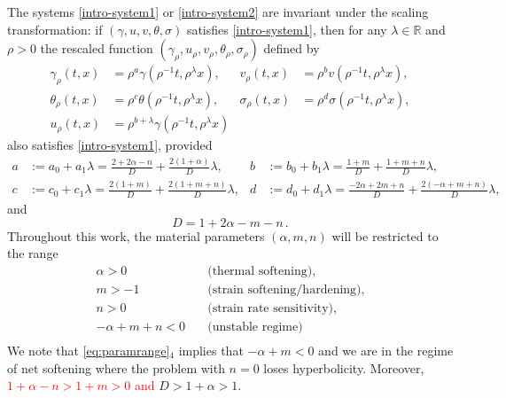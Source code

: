 \documentclass[usletter,11pt]{article}
\newcommand{\tcr}{\textcolor{red}}
\theoremstyle{remark}
\begin{document}
The systems \eqref{intro-system1} or \eqref{intro-system2} are invariant under the  scaling transformation: 
if $(\gamma,u,v,\theta,\sigma)$ satisfies \eqref{intro-system1}, then for any $\lambda \in \mathbb{R}$ and $\rho > 0$ the rescaled function 
$(\gamma_\rho, u_\rho,v_\rho,\theta_\rho,\sigma_\rho)$ defined by
\begin{equation}\label{eq:scale}
\begin{aligned}
 \gamma_\rho(t,x) &= \rho^a\gamma(\rho^{-1}t,\rho^\lambda x), &
 v_\rho(t,x) &= \rho^bv(\rho^{-1}t,\rho^\lambda x),\\
 \theta_\rho(t,x) &= \rho^c\theta(\rho^{-1}t,\rho^\lambda x), &
 \sigma_\rho(t,x) &= \rho^d\sigma(\rho^{-1}t,\rho^\lambda x),\\
 u_\rho(t,x) &= \rho^{b+\lambda}\gamma(\rho^{-1}t,\rho^\lambda x)
\end{aligned}
\end{equation}
also satisfies \eqref{intro-system1}, provided
\begin{equation} \label{eq:exponents}
\begin{aligned}
 a&:= a_0 + a_1 \lambda=\frac{2+2\alpha-n}{D} + \frac{2(1 + \alpha)}{D}\lambda, & b&:=b_0 + b_1\lambda=\frac{1+m}{D} + \frac{1+m+n}{D}\lambda ,\\
 c&:=c_0 + c_1\lambda=\frac{2(1+m)}{D} + \frac{2(1+m+n)}{D}\lambda, & d&:=d_0 + d_1\lambda=\frac{-2\alpha + 2m +n}{D} + \frac{2(-\alpha+m+n)}{D}\lambda,
\end{aligned}
\end{equation}
and 
\begin{equation}
\label{defD}
D = 1+2\alpha-m-n \, .
\end{equation}
Throughout this work, the material parameters $(\alpha,m,n)$ will be restricted to the range
\begin{equation}
\label{eq:paramrange}
 \begin{aligned}
  \alpha>0\quad&\text{(thermal softening)},\\
  m>-1 \quad&\text{(strain softening/hardening)}, \\%
  n>0 \quad&\text{(strain rate sensitivity)},\\ %
  -\alpha+m+n<0 \quad&\text{(unstable regime)} \\%
\end{aligned}
\end{equation}
We note that \eqref{eq:paramrange}$_4$ implies that $-\alpha + m <  0$ and we are in the regime of net softening where the problem with $n=0$ loses
hyperbolicity.  Moreover,  \tcr{  $1 + \alpha - n > 1 + m > 0$ and}  $D>1+\alpha>1$. 
\end{document}
